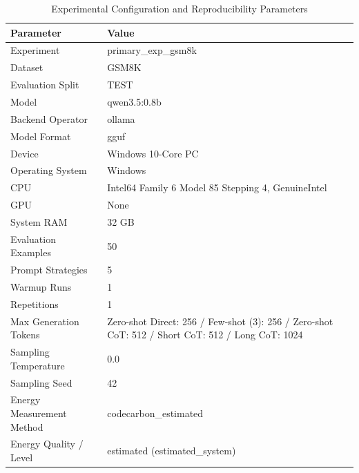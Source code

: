 \begin{table}
\caption{Experimental Configuration and Reproducibility Parameters}
\label{tab:experimental_configuration}
\begin{tabular}{ll}
\toprule
Parameter & Value \\
\midrule
Experiment & primary\_exp\_gsm8k \\
Dataset & GSM8K \\
Evaluation Split & TEST \\
Model & qwen3.5:0.8b \\
Backend Operator & ollama \\
Model Format & gguf \\
Device & Windows 10-Core PC \\
Operating System & Windows \\
CPU & Intel64 Family 6 Model 85 Stepping 4, GenuineIntel \\
GPU & None \\
System RAM & 32 GB \\
Evaluation Examples & 50 \\
Prompt Strategies & 5 \\
Warmup Runs & 1 \\
Repetitions & 1 \\
Max Generation Tokens & Zero-shot Direct: 256 / Few-shot (3): 256 / Zero-shot CoT: 512 / Short CoT: 512 / Long CoT: 1024 \\
Sampling Temperature & 0.0 \\
Sampling Seed & 42 \\
Energy Measurement Method & codecarbon\_estimated \\
Energy Quality / Level & estimated (estimated\_system) \\
\bottomrule
\end{tabular}
\end{table}
